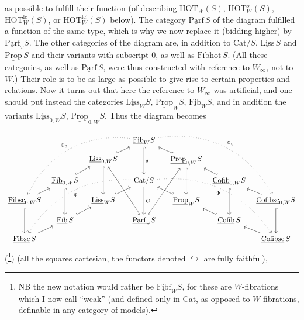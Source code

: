 \documentclass[11pt]{article}
\newcommand{\ul}[1]{\underline{\mathrm{#1}}}
\begin{document}
as possible to fulfill their function (of describing $\mathrm{HOT}_W(S)$, $\mathrm{HOT}^{o}_W(S)$, $\mathrm{HOT}^{\mathrm{lc}}_W(S)$, or $\mathrm{HOT}^{\mathrm{lc}!}_W(S)$ below). The category $\ul{Parf}\,S$ of the diagram fulfilled a function of the same type, which is why we now replace it (bidding higher) by $\ul{Parf}_\omega S$. The other categories of the diagram are, in addition to $\mathrm{Cat}/S$, $\ul{Liss}\,S$ and $\ul{Prop}\,S$ and their variants with subscript 0, as well as $\ul{Fibhot}\,S$. (All these categories, as well as $\ul{Parf}\,S$, were thus constructed with reference to $W_\infty$, not to $W$.) Their role is to be as large as possible to give rise to certain properties and relations. Now it turns out that here the reference to $W_\infty$ was artificial, and one should put instead the categories $\ul{Liss}_W S$, $\ul{Prop}_W S$, $\ul{Fib}_W S$, and in addition the variants $\ul{Liss}_{0,W} S$, $\ul{Prop}_{0,W} S$. Thus the diagram becomes %
\[
\begin{tikzcd}[column sep=tiny, row sep=small]
 & & & & \ul{Fib}_W S \arrow[dd, hook, "\delta"] \arrow[dddllll, dotted, bend right=35, "\Phi_0"'] \arrow[dddrrrr, dotted, bend left=35, "\Psi_0"] & & & & \\
 & & \ul{Liss}_{0,W} S \arrow[urr, hook] \arrow[dd, hook] & & & & \ul{Prop}_{0,W} S \arrow[ull, hook'] \arrow[dd, hook] & & \\
 & \ul{Fib}_{0,W} S \arrow[ur, hook] \arrow[dd, hook] & & & \mathrm{Cat}/S \arrow[dd, "C"] \arrow[dddllll, dotted, bend right=30, "\Phi"] \arrow[dddrrrr, dotted, bend left=30, "\Psi"'] & & & \ul{Cofib}_{0,W} S \arrow[ul, hook'] \arrow[dd, hook] & \\
\ul{Fibsc}_{0,W} S \arrow[ur] \arrow[dd, hook] & & \ul{Liss}_W S \arrow[urr, hook] & & & & \ul{Prop}_W S \arrow[ull, hook'] & & \ul{Cofibsc}_{0,W} S \arrow[ul] \arrow[dd, hook] \\
 & \ul{Fib}\,S \arrow[ur, hook] & & & \ul{Parf}_\omega S \arrow[uuull, hook] \arrow[uuurr, hook'] & & & \ul{Cofib}\,S \arrow[ul, hook'] & \\
\ul{Fibsc}\,S \arrow[ur] & & & & & & & & \ul{Cofibsc}\,S \arrow[ul]
\end{tikzcd}
\]
(\footnote{NB the new notation would rather be $\ul{Fibf}_W S$, for these are $W$-fibrations which I now call ``weak'' (and defined only in Cat, as opposed to $W$-fibrations, definable in any category of models).}) (all the squares cartesian, the functors denoted $\hookrightarrow$ are fully faithful),
\end{document}
